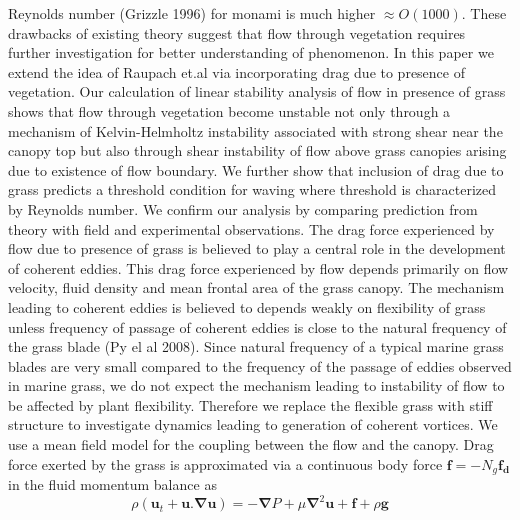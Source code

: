 \documentclass[aps,prl,twocolumn,showpacs,superscriptaddress,groupedaddress,10pt]{revtex4-1}  %
\newcommand{\bu}{\mathbf{u}}
\newcommand{\grad}{\mathbf{\nabla}}
\begin{document}
Reynolds number (Grizzle 1996) for monami is much higher $\approx O(1000)$. These drawbacks of existing theory suggest that flow through vegetation requires 
further investigation for better understanding of phenomenon.
\newline 
In this paper we extend the idea of Raupach et.al via incorporating drag due to presence of vegetation. Our calculation of linear stability analysis of flow in presence of grass
shows that flow through vegetation become unstable not only through a mechanism of Kelvin-Helmholtz 
instability associated with strong shear near the canopy top but also through shear instability of flow above grass canopies arising due to existence of flow boundary.
We further show that inclusion of drag due to grass predicts a threshold condition for waving where 
threshold is characterized by Reynolds number. We confirm our analysis by comparing prediction from theory with field and experimental observations.
\newline  
The drag force experienced by flow due to presence of grass is believed to play a central role in the development of coherent eddies. This drag force experienced by flow depends 
primarily on flow velocity, fluid density and mean frontal area of the grass canopy. The mechanism leading to coherent eddies is believed to depends weakly on flexibility of grass
unless frequency of passage of coherent eddies is close to the natural frequency of the grass blade (Py el al 2008). Since natural frequency of a typical marine grass blades are
very small compared to the frequency of the passage of eddies observed in marine grass, we do not expect the mechanism leading to instability of flow to be affected by plant flexibility.
Therefore we replace the flexible grass with stiff structure to investigate dynamics leading to generation of coherent vortices. We use a mean field model for the coupling between the flow and the canopy. Drag force exerted by the grass is approximated via a 
continuous body force $\mathbf{f}=-N_g\mathbf{f_d}$ in the fluid momentum balance as
\begin{equation}
\rho \left(\bu_{t}+\bu.\grad\bu \right) = -\grad P+\mu\grad^{2}\bu +\mathbf{f}+\rho\mathbf{g}
\label{navier-stokes}
\end{equation}
\end{document}
